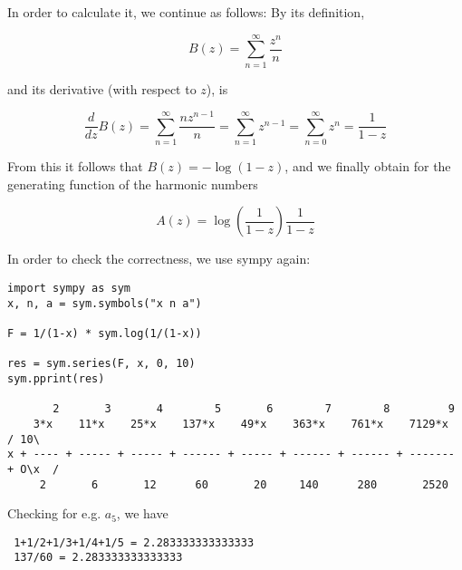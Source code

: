 In order to calculate it, we continue as follows: By its definition,

\[ B(z) = \sum_{n=1}^\infty \frac{z^n}{n}\]

and its derivative (with respect to $z$), is

\[ \frac{d}{dz} B(z) = \sum_{n=1}^\infty \frac{n z^{n-1}}{n} = \sum_{n=1}^\infty z^{n-1} = \sum_{n=0}^\infty z^{n} = \frac{1}{1-z}\]

From this it follows that $B(z) = -\log(1-z)$, and we finally obtain for the generating function of the harmonic numbers

\[A(z) =  \log(\frac{1}{1-z}) \frac{1}{1-z} \]

In order to check the correctness, we use sympy again:

\begin{verbatim}
import sympy as sym
x, n, a = sym.symbols("x n a")

F = 1/(1-x) * sym.log(1/(1-x))

res = sym.series(F, x, 0, 10)
sym.pprint(res)

       2       3       4        5       6        7        8         9         
    3*x    11*x    25*x    137*x    49*x    363*x    761*x    7129*x     / 10\
x + ---- + ----- + ----- + ------ + ----- + ------ + ------ + ------- + O\x  /
     2       6       12      60       20     140      280       2520          
\end{verbatim}

Checking for e.g. $a_5$, we have

\begin{verbatim}
 1+1/2+1/3+1/4+1/5 = 2.283333333333333
 137/60 = 2.283333333333333
\end{verbatim}
